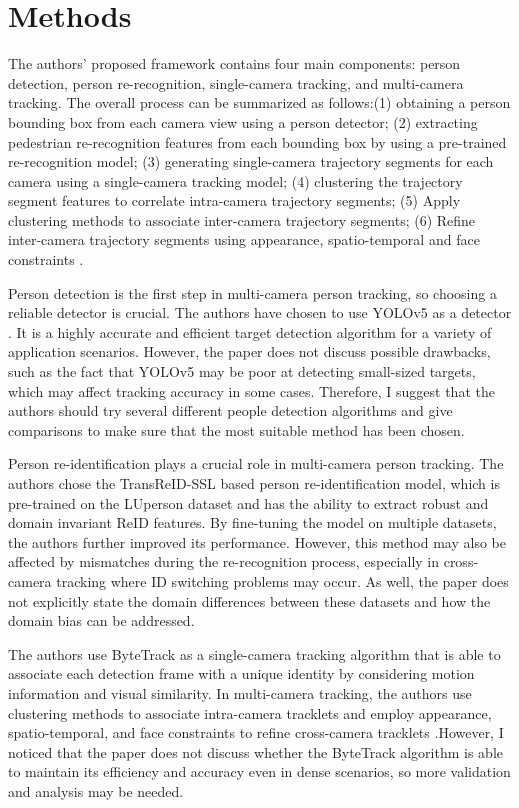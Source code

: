 \documentclass[a4paper,10pt,conference]{COMP9517}
\begin{document}
\section{Methods}
The authors' proposed framework contains four main components: person detection, person re-recognition, single-camera tracking, and multi-camera tracking. The overall process can be summarized as follows:(1) obtaining a person bounding box from each camera view using a person detector; (2) extracting pedestrian re-recognition features from each bounding box by using a pre-trained re-recognition model; (3) generating single-camera trajectory segments for each camera using a single-camera tracking model; (4) clustering the trajectory segment features to correlate intra-camera trajectory segments; (5) Apply clustering methods to associate inter-camera trajectory segments; (6) Refine inter-camera trajectory segments using appearance, spatio-temporal and face constraints \cite{Li_2023_CVPR}.

Person detection is the first step in multi-camera person tracking, so choosing a reliable detector is crucial. The authors have chosen to use YOLOv5 as a detector \cite{Li_2023_CVPR}. It is a highly accurate and efficient target detection algorithm for a variety of application scenarios. However, the paper does not discuss possible drawbacks, such as the fact that YOLOv5 may be poor at detecting small-sized targets, which may affect tracking accuracy in some cases. Therefore, I suggest that the authors should try several different people detection algorithms and give comparisons to make sure that the most suitable method has been chosen.

Person re-identification plays a crucial role in multi-camera person tracking. The authors chose the TransReID-SSL based person re-identification model, which is pre-trained on the LUperson dataset and has the ability to extract robust and domain invariant ReID features. By fine-tuning the model on multiple datasets, the authors further improved its performance. However, this method may also be affected by mismatches during the re-recognition process, especially in cross-camera tracking where ID switching problems may occur. As well, the paper does not explicitly state the domain differences between these datasets and how the domain bias can be addressed.

The authors use ByteTrack as a single-camera tracking algorithm that is able to associate each detection frame with a unique identity by considering motion information and visual similarity. In multi-camera tracking, the authors use clustering methods to associate intra-camera tracklets and employ appearance, spatio-temporal, and face constraints to refine cross-camera tracklets \cite{Li_2023_CVPR}.However, I noticed that the paper does not discuss whether the ByteTrack algorithm is able to maintain its efficiency and accuracy even in dense scenarios, so more validation and analysis may be needed.
\end{document}
